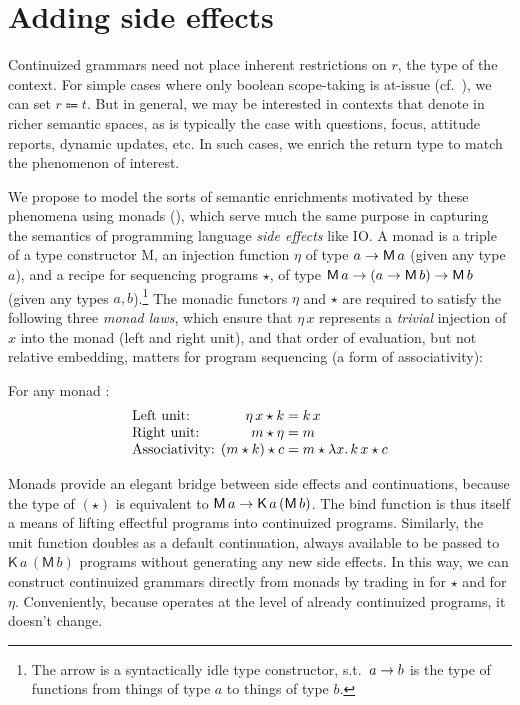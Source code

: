 
\section{Adding side effects}
  Continuized grammars need not place inherent restrictions on $r$, the type of the context. For simple cases where only boolean scope-taking is at-issue (cf.~\citealt{BarwiseCooper:1981}), we can set $r \Coloneqq t$. But in general, we may be interested in contexts that denote in richer semantic spaces, as is typically the case with questions, focus, attitude reports, dynamic updates, etc. In such cases, we enrich the return type to match the phenomenon of interest. %

  We propose to model the sorts of semantic enrichments motivated by these phenomena using monads (\citealt{Wadler:1994, Liangetal}), which serve much the same purpose in capturing the semantics of programming language \emph{side effects} like IO\@. A monad is a triple  of a type constructor \textsf{M}, an injection function $\eta$ of type $a \rightarrow \textsf{M}\,a$ (given any type $a$), and a recipe for sequencing programs $\star$, of type $\textsf{M}\,a \rightarrow (a \rightarrow \textsf{M}\,b) \rightarrow \textsf{M}\,b$ (given any types $a,b$).\footnote{The arrow is a syntactically idle type constructor, s.t.~$a \rightarrow b$ is the type of functions from things of type $a$ to things of type $b$.} The monadic functors $\eta$ and $\star$ are required to satisfy the following three \emph{monad laws}, which ensure that $\eta\,x$ represents a \emph{trivial} injection of $x$ into the monad (left and right unit), and that order of evaluation, but not relative embedding, matters for program sequencing (a form of associativity): %
	\begin{defi}%
		\label{defi:mlaw}
		For any monad :
		\[\begin{array}{l@{}r@{}l}
			\text{Left unit: }&\eta\,x \star k &{}= k\,x
			\\
			\text{Right unit: }&m \star \eta &{}= m
			\\
			\text{Associativity: }&(m \star k) \star c &{}= m \star \lambda x.\,k\,x \star c%
		\end{array}\]
	\end{defi}
	
  Monads provide an elegant bridge between side effects and continuations, because the type of $(\star)$ is equivalent to $\textsf{M}\,a \rightarrow \textsf{K}\,a\,(\textsf{M}\,b)$. The bind function is thus itself a means of lifting effectful programs into continuized programs. Similarly, the unit function doubles as a default continuation, always available to be passed to $\textsf{K}\,a\,(\textsf{M}\,b)$ programs without generating any new side effects. In this way, we can construct continuized grammars directly from monads by trading in  for $\star$ and  for $\eta$. Conveniently, because  operates at the level of already continuized programs, it doesn't change.%
	
